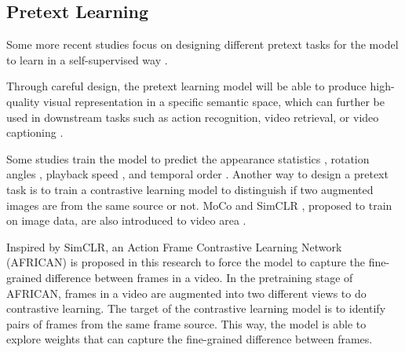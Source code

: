 \subsection{Pretext Learning}
Some more recent studies focus on designing different pretext tasks for the model to learn in a self-supervised way \parencite{wang2022internvideo}.

Through careful design, the pretext learning model will be able to produce high-quality visual representation in a specific semantic space, which can further be used in downstream tasks such as action recognition, video retrieval, or video captioning \parencite{10.1145/3577925}.

Some studies train the model to predict the appearance statistics \parencite{Wang_2019_CVPR}, rotation angles \parencite{DBLP:journals/corr/abs-1811-11387}, playback speed \parencite{Yao_2020_CVPR, 10.1007/978-3-030-58520-4_30}, and temporal order \parencite{10.1007/978-3-030-58604-1_26}. Another way to design a pretext task is to train a contrastive learning model to distinguish if two augmented images are from the same source or not. MoCo \parencite{finn2017model} and SimCLR \parencite{pmlr-v119-chen20j}, proposed to train on image data, are also introduced to video area \parencite{Feichtenhofer_2021_CVPR}.

Inspired by SimCLR, an Action Frame Contrastive Learning Network (AFRICAN) is proposed in this research to force the model to capture the fine-grained difference between frames in a video. In the pretraining stage of AFRICAN, frames in a video are augmented into two different views to do contrastive learning. The target of the contrastive learning model is to identify pairs of frames from the same frame source. This way, the model is able to explore weights that can capture the fine-grained difference between frames. 

